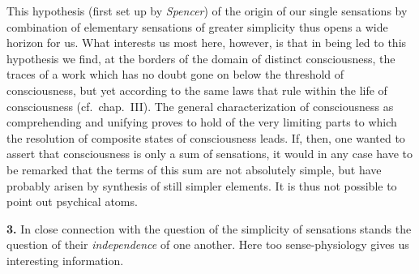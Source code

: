 \documentclass[12pt,a4paper]{book}
\newcommand{\opage}[1]{\marginnote{\footnotesize\textit{[#1]}}}
\begin{document}
This hypothesis (first set up by \emph{Spencer}) of the origin of our
single sensations by combination of elementary sensations of greater
simplicity thus opens a wide horizon for us. What interests us most
here, however, is that in being led to this hypothesis we find, at the
borders of the domain of distinct consciousness, the traces of a work
which has no doubt gone on below the threshold of consciousness, but yet
according to the same laws that rule within the life of consciousness
(cf.\ chap.\ III). The general characterization of consciousness as
comprehending and unifying proves to hold of the very limiting parts to
which the resolution of composite states of consciousness leads. If,
then, one wanted to assert that consciousness is only a sum of
sensations, it would in any case have to be remarked that
\opage{128}the terms of this sum are not absolutely simple, but have
probably arisen by synthesis of still simpler elements. It is thus not
possible to point out psychical atoms.

\textbf{3.} In close connection with the question of the simplicity of
sensations stands the question of their \emph{independence} of one
another. Here too sense-physiology gives us interesting information.
\end{document}
